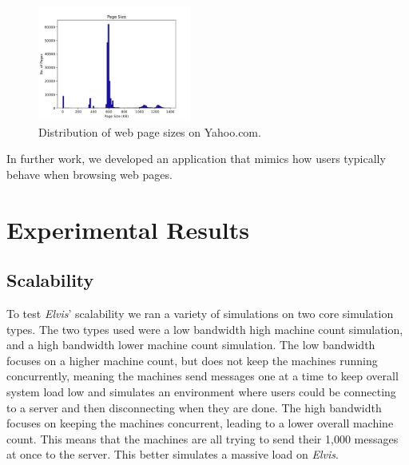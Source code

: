 \documentclass[journal]{IEEEtran} %
\newcommand{\imagewidth}{0.45\textwidth}
\newcommand{\elvis}{\textit{Elvis}}
\begin{document}
\begin{figure}[htbp]
    \centerline{\includegraphics[width=\imagewidth]{Images/web_sizes.png}}
    \caption{Distribution of web page sizes on Yahoo.com.}
    \label{fig:websize}
\end{figure}

In further work, we developed an application that mimics how users typically behave when browsing web pages.

\section{Experimental Results}

\subsection{Scalability}

To test \elvis{}' scalability we ran a variety of simulations on two core simulation types. The two types used were a low bandwidth high machine count simulation, and a high bandwidth lower machine count simulation. The low bandwidth focuses on a higher machine count, but does not keep the machines running concurrently, meaning the machines send messages one at a time to keep overall system load low and simulates an environment where users could be connecting to a server and then disconnecting when they are done. The high bandwidth focuses on keeping the machines concurrent, leading to a lower overall machine count. This means that the machines are all trying to send their 1,000 messages at once to the server. This better simulates a massive load on \elvis{}.
\end{document}
